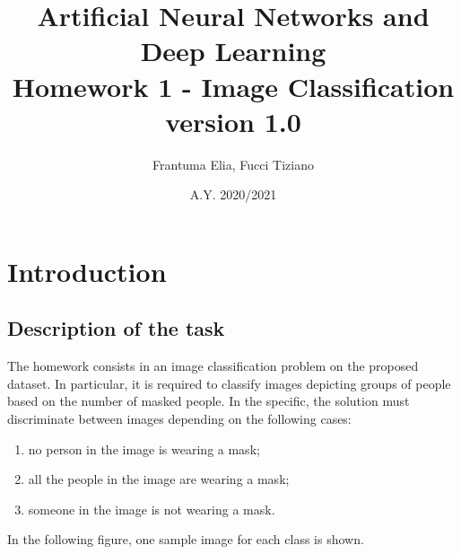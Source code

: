 \documentclass[12pt,a4paper]{report}
\title{Artificial Neural Networks and Deep Learning \\ Homework 1 - Image Classification \\ \large version 1.0}
\author{Frantuma Elia, Fucci Tiziano}
\date{A.Y. 2020/2021}
\begin{document}
	\maketitle
	\tableofcontents
	\chapter{Introduction}
		\section{Description of the task}
			The homework consists in an image classification problem on the proposed dataset. In particular, it is required to classify images depicting groups of people based on the number of masked people. In the specific, the solution must discriminate between images depending on the following cases:

\begin{enumerate} 
	\item no person in the image is wearing a mask;
	\item all the people in the image are wearing a mask;
	\item someone in the image is not wearing a mask.
\end{enumerate}
In the following figure, one sample image for each class is shown.
\end{document}
